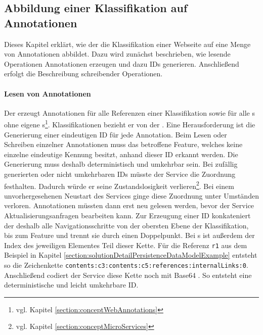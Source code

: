 \subsection{Abbildung einer Klassifikation auf Annotationen}
    \label{section:solutionDetailsAnnotationServiceMapping}
    Dieses Kapitel erklärt, wie der {\annotationService}
    die Klassifikation einer Webseite auf eine Menge von Annotationen abbildet.
    Dazu wird zunächst beschrieben, wie lesende Operationen Annotationen
    erzeugen und dazu IDs generieren.
    Anschließend erfolgt die Beschreibung schreibender Operationen.

    \paragraph*{Lesen von Annotationen}
    Der {\annotationService} erzeugt Annotationen für alle Referenzen einer Klassifikation
    sowie für alle {\contentFeature}s ohne eigene
    {\contentFeature}s\footnote{vgl. Kapitel \ref{section:conceptWebAnnotations}}.
    Klassifikationen bezieht er von der {\classificationStorageAPI}.
    Eine Herausforderung ist die Generierung einer eindeutigen ID für jede Annotation.
    Beim Lesen oder Schreiben einzelner Annotationen muss das betroffene
    Feature, welches keine einzelne eindeutige Kennung besitzt, anhand dieser ID erkannt werden.
    Die Generierung muss deshalb deterministisch und umkehrbar sein.
    Bei zufällig generierten oder nicht umkehrbaren IDs müsste der Service
    die Zuordnung festhalten.
    Dadurch würde er seine Zustandslosigkeit
    verlieren\footnote{vgl. Kapitel \ref{section:conceptMicroServices}}.
    Bei einem unvorhergesehenen Neustart des Services ginge diese Zuordnung unter Umständen verloren.
    Annotationen müssten dann erst neu gelesen werden,
    bevor der Service Aktualisierungsanfragen bearbeiten kann.
    Zur Erzeugung einer ID konkateniert der {\annotationService} deshalb
    alle Navigationsschritte von der obersten Ebene der Klassifikation,
    bis zum Feature und trennt sie durch einen Doppelpunkt.
    Bei {\collectionFeature}s ist außerdem der Index des jeweiligen Elementes Teil dieser Kette.
    Für die Referenz \texttt{r1} aus dem Beispiel in Kapitel \ref{section:solutionDetailPersistenceDataModelExample}
    entsteht so die Zeichenkette \texttt{contents:c3:contents:c5:references:internalLinks:0}.
    Anschließend codiert der Service diese Kette noch mit Base64 \cite{rfc:4648}.
    So entsteht eine deterministische und leicht umkehrbare ID.

